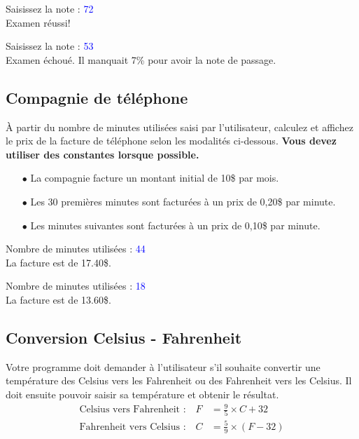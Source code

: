 \documentclass[12pt]{article}
\newenvironment{console}
	{
	\tcolorbox[title={Sortie console}, sharp corners = south, boxsep = 1.5mm]{} \tt
	}{\endtcolorbox}
\begin{document}
\begin{console}
Saisissez la note :  \textcolor{blue}{72} \\
Examen réussi!
\end{console}

\begin{console}
Saisissez la note :  \textcolor{blue}{53} \\
Examen échoué. Il manquait 7\% pour avoir la note de passage.
\end{console}


% 
%
%

\subsection{Compagnie de téléphone}\label{ex-telephone}

À partir du nombre de minutes utilisées saisi par l’utilisateur, calculez et affichez le prix de la facture de téléphone selon les modalités ci-dessous. \textbf{Vous devez utiliser des constantes lorsque possible.}

\begin{itemize}
	\item[$\bullet$] La compagnie facture un montant initial de 10\$ par mois.
	\item[$\bullet$] Les 30 premières minutes sont facturées à un prix de 0,20\$ par minute.
	\item[$\bullet$] Les minutes suivantes sont facturées à un prix de 0,10\$ par minute.
\end{itemize}

\begin{console}
Nombre de minutes utilisées :  \textcolor{blue}{44} \\
La facture est de 17.40\$.
\end{console}

\begin{console}
Nombre de minutes utilisées :  \textcolor{blue}{18} \\
La facture est de 13.60\$.
\end{console}

%
%
%
%

\subsection{Conversion Celsius - Fahrenheit}

Votre programme doit demander à l'utilisateur s'il souhaite convertir une température des Celsius vers les Fahrenheit ou des Fahrenheit vers les Celsius. Il doit ensuite pouvoir saisir sa température et obtenir le résultat.
%
\begin{align*}
	\text{Celsius vers Fahrenheit :} \quad F &= \frac{9}{5} \times C + 32\\[5pt]
	\text{Fahrenheit vers Celsius :} \quad C &= \frac{5}{9} \times (F - 32)
\end{align*}
\end{document}

